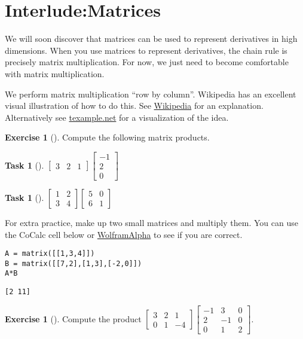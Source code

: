 \documentclass[10pt,]{book}
\theoremstyle{plain}
\theoremstyle{definition}
\theoremstyle{definition}
\theoremstyle{definition}
\theoremstyle{definition}
\newtheorem{exploration}[project]{Exercise}
\newtheorem{task}[project]{Task}
\theoremstyle{definition}
\numberwithin{equation}{section}
\newcommand{\amp}{&}
\begin{document}
\section[{Interlude:Matrices}]{Interlude:Matrices}\label{review_matrices}
We will soon discover that matrices can be used to represent derivatives in high dimensions. When you use matrices to represent derivatives, the chain rule is precisely matrix multiplication. For now, we just need to become comfortable with matrix multiplication.%
\par
We perform matrix multiplication ``row by column''. Wikipedia has an excellent visual illustration of how to do this. See \href{http://en.wikipedia.org/wiki/Matrix_multiplication}{Wikipedia} for an explanation. Alternatively see \href{http://www.texample.net/tikz/examples/matrix-multiplication/}{texample.net} for a visualization of the idea.%
\begin{exploration}[]\label{exploration-37}
Compute the following matrix products.%
\begin{task}[]\label{task-70}
\(\begin{bmatrix}3 \amp  2\amp  1
\end{bmatrix} 
\begin{bmatrix}-1 \\
2\\
0
\end{bmatrix}\)%
\end{task}
\begin{task}[]\label{task-71}
\(\begin{bmatrix}1 \amp 2\\3\amp 4
\end{bmatrix} \begin{bmatrix}5\amp 0\\6\amp 1
\end{bmatrix}\)%
\end{task}
\bigbreak
For extra practice, make up two small matrices and multiply them. You can use the CoCalc cell below or \href{http://www.wolframalpha.com/input/?i=\%281\%2C3\%2C4\%29+*\%28\%287\%2C2\%29\%2C\%281\%2C3\%29\%2C\%28-2\%2C0\%29\%29}{WolframAlpha} to see if you are correct.%
\begin{lstlisting}[style=sageinput]
A = matrix([[1,3,4]])
B = matrix([[7,2],[1,3],[-2,0]])
A*B
\end{lstlisting}
\begin{lstlisting}[style=sageoutput]
[2 11]
\end{lstlisting}
\end{exploration}
\begin{exploration}[]\label{exploration-38}
Compute the product \(\begin{bmatrix}3 \amp  2\amp  1\\
0 \amp  1\amp  -4
\end{bmatrix} 
\begin{bmatrix}-1\amp 3 \amp 0 \\
2\amp -1 \amp 0\\
0\amp 1 \amp 2
\end{bmatrix}\).%
\end{exploration}
\typeout{************************************************}
\typeout{************************************************}
\end{document}
